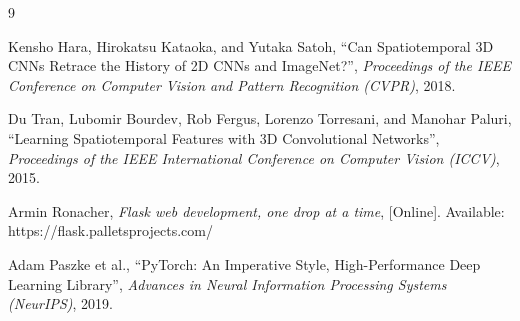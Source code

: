 \documentclass[conference]{IEEEtran}
\begin{document}
\begin{thebibliography}{9}

Kensho Hara, Hirokatsu Kataoka, and Yutaka Satoh, 
``Can Spatiotemporal 3D CNNs Retrace the History of 2D CNNs and ImageNet?'', 
\textit{Proceedings of the IEEE Conference on Computer Vision and Pattern Recognition (CVPR)}, 2018.

Du Tran, Lubomir Bourdev, Rob Fergus, Lorenzo Torresani, and Manohar Paluri, 
``Learning Spatiotemporal Features with 3D Convolutional Networks'', 
\textit{Proceedings of the IEEE International Conference on Computer Vision (ICCV)}, 2015.

Armin Ronacher, \textit{Flask web development, one drop at a time}, 
[Online]. Available: https://flask.palletsprojects.com/

Adam Paszke et al., ``PyTorch: An Imperative Style, High-Performance Deep Learning Library'', 
\textit{Advances in Neural Information Processing Systems (NeurIPS)}, 2019.

\end{thebibliography}
\end{document}
